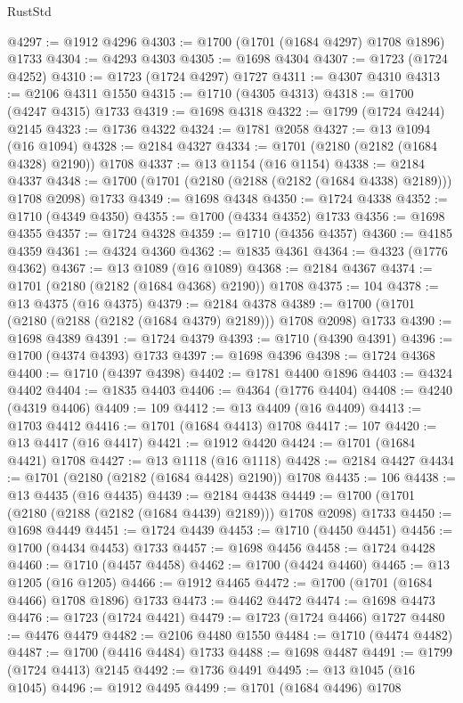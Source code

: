 \begin{lexlean}{RustStd}
\begin{coremodule}
@4297 := @1912 @4296
@4303 := @1700 (@1701 (@1684 @4297) @1708 @1896) @1733
@4304 := @4293 @4303
@4305 := @1698 @4304
@4307 := @1723 (@1724 @4252)
@4310 := @1723 (@1724 @4297) @1727
@4311 := @4307 @4310
@4313 := @2106 @4311 @1550
@4315 := @1710 (@4305 @4313)
@4318 := @1700 (@4247 @4315) @1733
@4319 := @1698 @4318
@4322 := @1799 (@1724 @4244) @2145
@4323 := @1736 @4322
@4324 := @1781 @2058
@4327 := @13 @1094 (@16 @1094)
@4328 := @2184 @4327
@4334 := @1701 (@2180 (@2182 (@1684 @4328) @2190)) @1708
@4337 := @13 @1154 (@16 @1154)
@4338 := @2184 @4337
@4348 := @1700 (@1701 (@2180 (@2188 (@2182 (@1684 @4338) @2189))) @1708 @2098) @1733
@4349 := @1698 @4348
@4350 := @1724 @4338
@4352 := @1710 (@4349 @4350)
@4355 := @1700 (@4334 @4352) @1733
@4356 := @1698 @4355
@4357 := @1724 @4328
@4359 := @1710 (@4356 @4357)
@4360 := @4185 @4359
@4361 := @4324 @4360
@4362 := @1835 @4361
@4364 := @4323 (@1776 @4362)
@4367 := @13 @1089 (@16 @1089)
@4368 := @2184 @4367
@4374 := @1701 (@2180 (@2182 (@1684 @4368) @2190)) @1708
@4375 := 104
@4378 := @13 @4375 (@16 @4375)
@4379 := @2184 @4378
@4389 := @1700 (@1701 (@2180 (@2188 (@2182 (@1684 @4379) @2189))) @1708 @2098) @1733
@4390 := @1698 @4389
@4391 := @1724 @4379
@4393 := @1710 (@4390 @4391)
@4396 := @1700 (@4374 @4393) @1733
@4397 := @1698 @4396
@4398 := @1724 @4368
@4400 := @1710 (@4397 @4398)
@4402 := @1781 @4400 @1896
@4403 := @4324 @4402
@4404 := @1835 @4403
@4406 := @4364 (@1776 @4404)
@4408 := @4240 (@4319 @4406)
@4409 := 109
@4412 := @13 @4409 (@16 @4409)
@4413 := @1703 @4412
@4416 := @1701 (@1684 @4413) @1708
@4417 := 107
@4420 := @13 @4417 (@16 @4417)
@4421 := @1912 @4420
@4424 := @1701 (@1684 @4421) @1708
@4427 := @13 @1118 (@16 @1118)
@4428 := @2184 @4427
@4434 := @1701 (@2180 (@2182 (@1684 @4428) @2190)) @1708
@4435 := 106
@4438 := @13 @4435 (@16 @4435)
@4439 := @2184 @4438
@4449 := @1700 (@1701 (@2180 (@2188 (@2182 (@1684 @4439) @2189))) @1708 @2098) @1733
@4450 := @1698 @4449
@4451 := @1724 @4439
@4453 := @1710 (@4450 @4451)
@4456 := @1700 (@4434 @4453) @1733
@4457 := @1698 @4456
@4458 := @1724 @4428
@4460 := @1710 (@4457 @4458)
@4462 := @1700 (@4424 @4460)
@4465 := @13 @1205 (@16 @1205)
@4466 := @1912 @4465
@4472 := @1700 (@1701 (@1684 @4466) @1708 @1896) @1733
@4473 := @4462 @4472
@4474 := @1698 @4473
@4476 := @1723 (@1724 @4421)
@4479 := @1723 (@1724 @4466) @1727
@4480 := @4476 @4479
@4482 := @2106 @4480 @1550
@4484 := @1710 (@4474 @4482)
@4487 := @1700 (@4416 @4484) @1733
@4488 := @1698 @4487
@4491 := @1799 (@1724 @4413) @2145
@4492 := @1736 @4491
@4495 := @13 @1045 (@16 @1045)
@4496 := @1912 @4495
@4499 := @1701 (@1684 @4496) @1708

\end{coremodule}
\end{lexlean}
